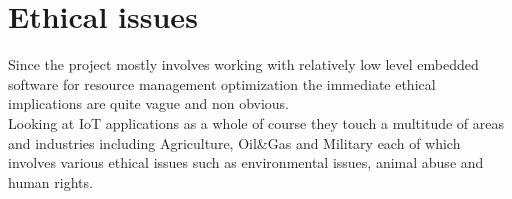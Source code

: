 \chapter{Ethical issues}

Since the project mostly involves working with relatively low level embedded software for resource management optimization the immediate ethical implications are quite vague and non obvious. \\

Looking at IoT applications as a whole of course they touch a multitude of areas and industries including Agriculture, Oil\&Gas and Military \cite{lora_battlefield} \cite{lora_troops} each of which involves various ethical issues such as environmental issues, animal abuse and human rights.